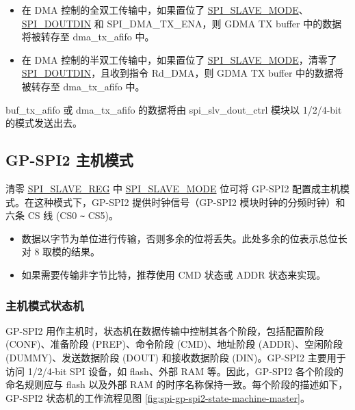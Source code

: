 \documentclass[main\_\_CN.tex]{subfiles}
\begin{document}
\begin{itemize}
\begin{itemize}
        \item 在 DMA 控制的全双工传输中，如果置位了 \hyperref[fielddesc:SPISLAVEMODE]{SPI\_SLAVE\_MODE}、\hyperref[fielddesc:SPIDOUTDIN]{SPI\_DOUTDIN} 和 SPI\_DMA\_TX\_ENA，则 GDMA TX buffer 中的数据将被转存至 dma\_tx\_afifo 中。

        \item 在 DMA 控制的半双工传输中，如果置位了 \hyperref[fielddesc:SPISLAVEMODE]{SPI\_SLAVE\_MODE}，清零了 \hyperref[fielddesc:SPIDOUTDIN]{SPI\_DOUTDIN}，且收到指令 Rd\_DMA，则 GDMA TX buffer 中的数据将被转存至 dma\_tx\_afifo 中。

    \end{itemize}

buf\_tx\_afifo 或 dma\_tx\_afifo 的数据将由 spi\_slv\_dout\_ctrl 模块以 1/2/4-bit 的模式发送出去。
\end{itemize}

\subsection{GP-SPI2 主机模式}\label{sec:spi-func-descr-gp-spi2-master}
清零 \hyperref[regdesc:SPISLAVEREG]{SPI\_SLAVE\_REG} 中 \hyperref[fielddesc:SPISLAVEMODE]{SPI\_SLAVE\_MODE} 位可将 GP-SPI2 配置成主机模式。在这种模式下，GP-SPI2 提供时钟信号（GP-SPI2 模块时钟的分频时钟）和六条 CS 线 (CS0 \verb+~+ CS5)。

\begin{tiplisting}
\vspace{-2em}
\begin{itemize}
    \item 数据以字节为单位进行传输，否则多余的位将丢失。此处多余的位表示总位长对 8 取模的结果。
    \item 如果需要传输非字节比特，推荐使用 CMD 状态或 ADDR 状态来实现。
\end{itemize}
\end{tiplisting}


\subsubsection{主机模式状态机}
\label{sec:spi-state-machine}

GP-SPI2 用作主机时，状态机在数据传输中控制其各个阶段，包括配置阶段 (CONF)、准备阶段 (PREP)、命令阶段 (CMD)、地址阶段 (ADDR)、空闲阶段 (DUMMY)、发送数据阶段 (DOUT) 和接收数据阶段 (DIN)。GP-SPI2 主要用于访问 1/2/4-bit SPI 设备，如 flash、外部 RAM 等。因此，GP-SPI2 各个阶段的命名规则应与 flash 以及外部 RAM 的时序名称保持一致。每个阶段的描述如下，GP-SPI2 状态机的工作流程见图  \ref{fig:spi-gp-spi2-state-machine-master}。
\end{document}
